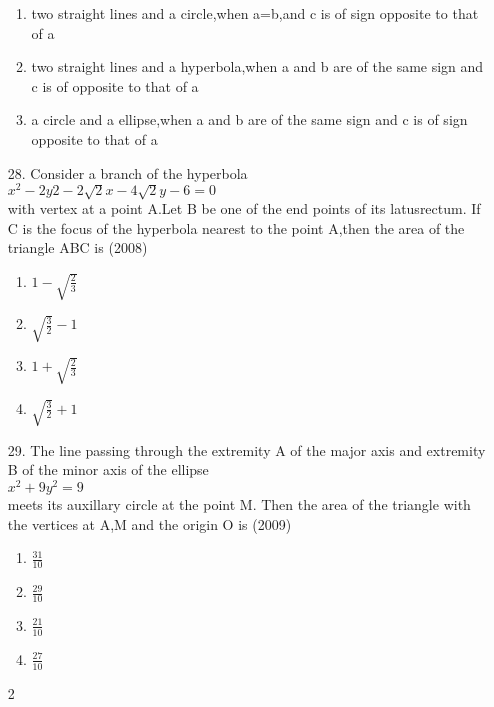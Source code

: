 \documentclass[journal,12pt,twocolumn]{IEEEtran}
\theoremstyle{remark}
\begin{document}
\begin{enumerate}
\begin{enumerate}
    \item two straight lines and a circle,when a=b,and c is of sign opposite to that of a\\
    \item two straight lines and a hyperbola,when a and b are of the same sign and c is of opposite to that of a\\
    \item a circle and a ellipse,when a and b are of the same sign and c is of sign opposite to that of a\\
\end{enumerate}
\item[28.] Consider a branch of the hyperbola\\$x^{2}-2y{2}-2\sqrt{2}x-4\sqrt{2}y-6=0$\\with vertex at a point A.Let B be one of the end points of its latusrectum. If C is the focus of the hyperbola nearest to the point A,then the area of the triangle ABC is \hfill{(2008)}
\begin{multicols}{4}
\begin{enumerate}
    \item $1-\sqrt{\frac{2}{3}}$
    \item $\sqrt{\frac{3}{2}}-1$
    \item $1+\sqrt{\frac{2}{3}}$
    \item $\sqrt{\frac{3}{2}}+1$
\end{enumerate}
\end{multicols}
\item[29.] The line passing through the extremity A of the major axis and extremity B of the minor axis of the ellipse\\$x^{2}+9y^{2}=9$\\meets its auxillary circle at the point M. Then the area of the triangle with the vertices at A,M and the origin O is \hfill{(2009)}
\begin{multicols}{4}
\begin{enumerate}
    \item $\frac{31}{10}$
    \item $\frac{29}{10}$
    \item $\frac{21}{10}$
    \item $\frac{27}{10}$
\end{enumerate}
\end{multicols}{2}
\end{enumerate}
\end{document}
